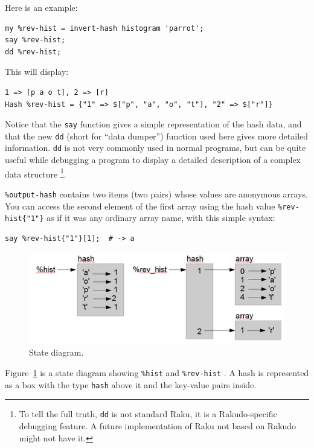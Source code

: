 Here is an example:

\begin{verbatim}
my %rev-hist = invert-hash histogram 'parrot';
say %rev-hist;
dd %rev-hist;
\end{verbatim}

This will display:

\begin{verbatim}
1 => [p a o t], 2 => [r]
Hash %rev-hist = {"1" => $["p", "a", "o", "t"], "2" => $["r"]}
\end{verbatim}

Notice that the {\tt say} function gives a simple representation 
of the hash data, and that the new {\tt dd} (short for ``data 
dumper'') function used here gives more detailed information. 
{\tt dd} is not very commonly used in normal programs, but 
can be quite useful while debugging a program to display a 
detailed description of a complex data structure 
\footnote{To tell the full truth, {\tt dd} is not standard 
Raku, it is a Rakudo-specific debugging feature. A future 
implementation of Raku not based on Rakudo might not have 
it.}.

\verb'%output-hash' contains two items (two pairs) whose 
values are anonymous arrays. You can access the second 
element of the first array using the hash value 
\verb'%rev-hist{"1"}' as if it was any ordinary array name, 
with this simple syntax:

\begin{verbatim}
say %rev-hist{"1"}[1];  # -> a
\end{verbatim}


\begin{figure}
\centerline
{\includegraphics[scale=0.8]{figs/hash1.png}}
\caption{State diagram.}
\label{fig.hash1}
\end{figure}

Figure~\ref{fig.hash1} is a state diagram showing \verb'%hist'  and \verb'%rev-hist' .
A hash is represented as a box with the type {\tt hash} above it
and the key-value pairs inside.

